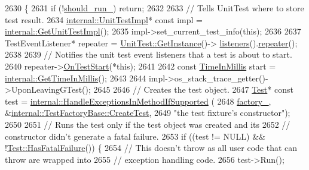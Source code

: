\begin{DoxyCode}
2630                    \{
2631   \textcolor{keywordflow}{if} (!\hyperlink{classtesting_1_1TestInfo_a89c3d8fb8b565532c34d3123240fd5cf}{should\_run\_}) \textcolor{keywordflow}{return};
2632 
2633   \textcolor{comment}{// Tells UnitTest where to store test result.}
2634   \hyperlink{classtesting_1_1TestInfo_acc0a5e7573fd6ae7ad1878613bb86853}{internal::UnitTestImpl}* \textcolor{keyword}{const} impl = 
      \hyperlink{namespacetesting_1_1internal_a9bd0caf5d16512de38b39599c13ee634}{internal::GetUnitTestImpl}();
2635   impl->set\_current\_test\_info(\textcolor{keyword}{this});
2636 
2637   TestEventListener* repeater = \hyperlink{classtesting_1_1UnitTest_a24192400b70b3b946746954e9574fb8e}{UnitTest::GetInstance}()->
      \hyperlink{classtesting_1_1UnitTest_aac10085cf7c0d1751306db10cdd953cb}{listeners}().\hyperlink{classtesting_1_1TestEventListeners_ad28af964081553de465fbfc1c5a46650}{repeater}();
2638 
2639   \textcolor{comment}{// Notifies the unit test event listeners that a test is about to start.}
2640   repeater->\hyperlink{classtesting_1_1TestEventListener_ab4f6a0ca16ae75daf385b3b5914e1048}{OnTestStart}(*\textcolor{keyword}{this});
2641 
2642   \textcolor{keyword}{const} \hyperlink{namespacetesting_a992de1d091ce660f451d1e8b3ce30fd6}{TimeInMillis} start = \hyperlink{namespacetesting_1_1internal_ae66b46943a429e6efb1db456d4cae90c}{internal::GetTimeInMillis}();
2643 
2644   impl->os\_stack\_trace\_getter()->UponLeavingGTest();
2645 
2646   \textcolor{comment}{// Creates the test object.}
2647   \hyperlink{classtesting_1_1TestInfo_a5b78b1c2e1fa07ffed92da365593eaa4}{Test}* \textcolor{keyword}{const} test = \hyperlink{namespacetesting_1_1internal_addb2ed165b92b74e25fe9ebe9e46b9f9}{internal::HandleExceptionsInMethodIfSupported}
      (
2648       \hyperlink{classtesting_1_1TestInfo_a6bf2422602b877c73f6eb169a63cfea8}{factory\_}, &\hyperlink{classtesting_1_1internal_1_1TestFactoryBase_a07ac3ca0b196cdb092da0bb186b7c030}{internal::TestFactoryBase::CreateTest},
2649       \textcolor{stringliteral}{"the test fixture's constructor"});
2650 
2651   \textcolor{comment}{// Runs the test only if the test object was created and its}
2652   \textcolor{comment}{// constructor didn't generate a fatal failure.}
2653   \textcolor{keywordflow}{if} ((test != NULL) && !\hyperlink{classtesting_1_1Test_aa8d0725cfb519f82eaf4fd2d2f46d97d}{Test::HasFatalFailure}()) \{
2654     \textcolor{comment}{// This doesn't throw as all user code that can throw are wrapped into}
2655     \textcolor{comment}{// exception handling code.}
2656     test->Run();

\end{DoxyCode}
